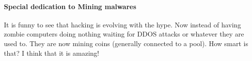 \paragraph{Special dedication to Mining malwares}
It is funny to see that hacking is evolving with the hype. Now instead of having zombie computers doing nothing waiting for DDOS attacks or whatever they are used to. They are now mining coins (generally connected to a pool). How smart is that? I think that it is amazing!

